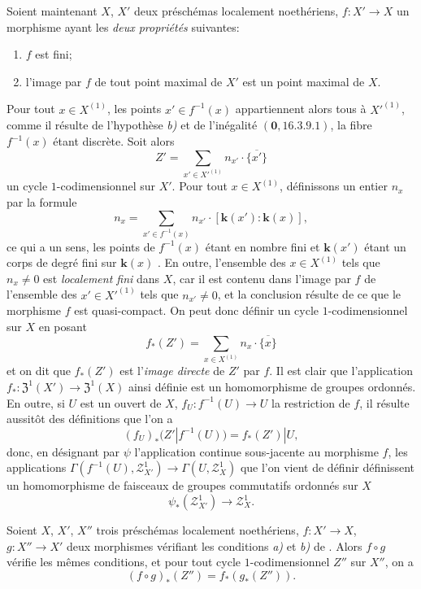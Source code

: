 \begin{env}[21.10.14]
\label{IV.21.10.14}
Soient maintenant $X$, $X'$ deux préschémas localement noethériens, $f:X'\to X$ un morphisme ayant les \emph{deux propriétés} suivantes:
\begin{enumerate}[label=\emph{\alph*)}]
  \item $f$ est fini;
  \item l'image par $f$ de tout point maximal de $X'$ est un point maximal de $X$.
\end{enumerate}
Pour tout $x\in X^{(1)}$, les points $x'\in f^{-1}(x)$ appartiennent alors tous à $X'^{(1)}$, comme il résulte de l'hypothèse \emph{b)} et de l'inégalité $(\mathbf{0},16.3.9.1)$, la fibre $f^{-1}(x)$ étant discrète.
Soit alors
\[
  Z'=\sum_{x'\in X'^{(1)}}n_{x'}\cdot\overline{\{x'\}}
\]
un cycle $1$-codimensionnel sur $X'$.
Pour tout $x\in X^{(1)}$, définissons un entier $n_x$ par la formule
\[
  n_x=\sum_{x'\in f^{-1}(x)}n_{x'}\cdot[\boldsymbol{k}(x'): \boldsymbol{k}(x)],
\]
ce qui a un sens, les points de $f^{-1}(x)$ étant en nombre fini et $\boldsymbol{k}(x')$ étant un corps de degré fini sur $\boldsymbol{k}(x)$ .
En outre, l'ensemble des $x\in X^{(1)}$ tels que $n_x\neq0$ est \emph{localement fini} dans $X$, car il est contenu dans l'image par $f$ de l'ensemble des $x'\in X'^{(1)}$ tels que $n_{x'}\neq0$, et la conclusion résulte de ce que le morphisme $f$ est quasi-compact.
On peut donc définir un cycle $1$-codimensionnel sur $X$ en posant
\[
\label{IV.21.10.14.1}
  f_*(Z')=\sum_{x\in X^{(1)}}n_x\cdot\overline{\{x\}}
  \tag{21.10.14.1}
\]
et on dit que $f_*(Z')$ est l'\emph{image directe} de $Z'$ par $f$.
Il est clair que l'application $f_*:\mathfrak{Z}^1(X')\to\mathfrak{Z}^1(X)$ ainsi définie est un homomorphisme de groupes ordonnés.
En outre, si $U$ est un ouvert de $X$, $f_U:f^{-1}(U)\to U$ la restriction de $f$, il résulte aussitôt des définitions que l'on a
\[
\label{IV.21.10.14.2}
  (f_U)_*(Z'|f^{-1}(U))=f_*(Z')|U,
  \tag{21.10.14.2}
\]
donc, en désignant par $\psi$ l'application continue sous-jacente au morphisme $f$, les applications $\Gamma(f^{-1}(U),\mathscr{Z}^1_{X'})\to\Gamma(U,\mathscr{Z}^1_X)$ que l'on vient de définir définissent un homomorphisme de faisceaux de groupes commutatifs ordonnés sur $X$
\[
  \psi_*(\mathscr{Z}^1_{X'})\to\mathscr{Z}^1_X.
\]
\end{env}

\begin{proposition}[21.10.15]
\label{IV.21.10.15}
Soient $X$, $X'$, $X''$ trois préschémas localement noethériens, $f:X'\to X$, $g:X''\to X'$ deux morphismes vérifiant les conditions \emph{a)} et \emph{b)} de .
Alors $f\circ g$ vérifie les mêmes conditions, et pour tout cycle $1$-codimensionnel $Z''$ sur $X''$, on a
\[
  (f\circ g)_*(Z'')=f_*(g_*(Z'')).
\]
\end{proposition}

